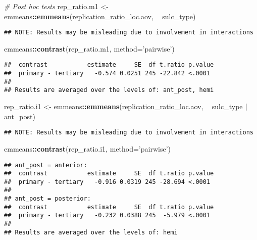 \documentclass[
]{article}
\newenvironment{Shaded}{\begin{snugshade}}{\end{snugshade}}
\newcommand{\CommentTok}[1]{\textcolor[rgb]{0.56,0.35,0.01}{\textit{#1}}}
\newcommand{\DataTypeTok}[1]{\textcolor[rgb]{0.13,0.29,0.53}{#1}}
\newcommand{\KeywordTok}[1]{\textcolor[rgb]{0.13,0.29,0.53}{\textbf{#1}}}
\newcommand{\NormalTok}[1]{#1}
\newcommand{\OperatorTok}[1]{\textcolor[rgb]{0.81,0.36,0.00}{\textbf{#1}}}
\newcommand{\StringTok}[1]{\textcolor[rgb]{0.31,0.60,0.02}{#1}}
\begin{document}
\begin{Shaded}
\begin{Highlighting}[]
\CommentTok{# Post hoc tests}
\NormalTok{rep_ratio.m1 <-}\StringTok{ }\NormalTok{emmeans}\OperatorTok{::}\KeywordTok{emmeans}\NormalTok{(replication_ratio_loc.aov, }\OperatorTok{~}\StringTok{ }\NormalTok{sulc_type)}
\end{Highlighting}
\end{Shaded}

\begin{verbatim}
## NOTE: Results may be misleading due to involvement in interactions
\end{verbatim}

\begin{Shaded}
\begin{Highlighting}[]
\NormalTok{emmeans}\OperatorTok{::}\KeywordTok{contrast}\NormalTok{(rep_ratio.m1, }\DataTypeTok{method=}\StringTok{'pairwise'}\NormalTok{)}
\end{Highlighting}
\end{Shaded}

\begin{verbatim}
##  contrast           estimate     SE  df t.ratio p.value
##  primary - tertiary   -0.574 0.0251 245 -22.842 <.0001 
## 
## Results are averaged over the levels of: ant_post, hemi
\end{verbatim}

\begin{Shaded}
\begin{Highlighting}[]
\NormalTok{rep_ratio.i1 <-}\StringTok{ }\NormalTok{emmeans}\OperatorTok{::}\KeywordTok{emmeans}\NormalTok{(replication_ratio_loc.aov, }\OperatorTok{~}\StringTok{ }\NormalTok{sulc_type }\OperatorTok{|}\StringTok{ }\NormalTok{ant_post)}
\end{Highlighting}
\end{Shaded}

\begin{verbatim}
## NOTE: Results may be misleading due to involvement in interactions
\end{verbatim}

\begin{Shaded}
\begin{Highlighting}[]
\NormalTok{emmeans}\OperatorTok{::}\KeywordTok{contrast}\NormalTok{(rep_ratio.i1, }\DataTypeTok{method=}\StringTok{'pairwise'}\NormalTok{)}
\end{Highlighting}
\end{Shaded}

\begin{verbatim}
## ant_post = anterior:
##  contrast           estimate     SE  df t.ratio p.value
##  primary - tertiary   -0.916 0.0319 245 -28.694 <.0001 
## 
## ant_post = posterior:
##  contrast           estimate     SE  df t.ratio p.value
##  primary - tertiary   -0.232 0.0388 245  -5.979 <.0001 
## 
## Results are averaged over the levels of: hemi
\end{verbatim}
\end{document}
